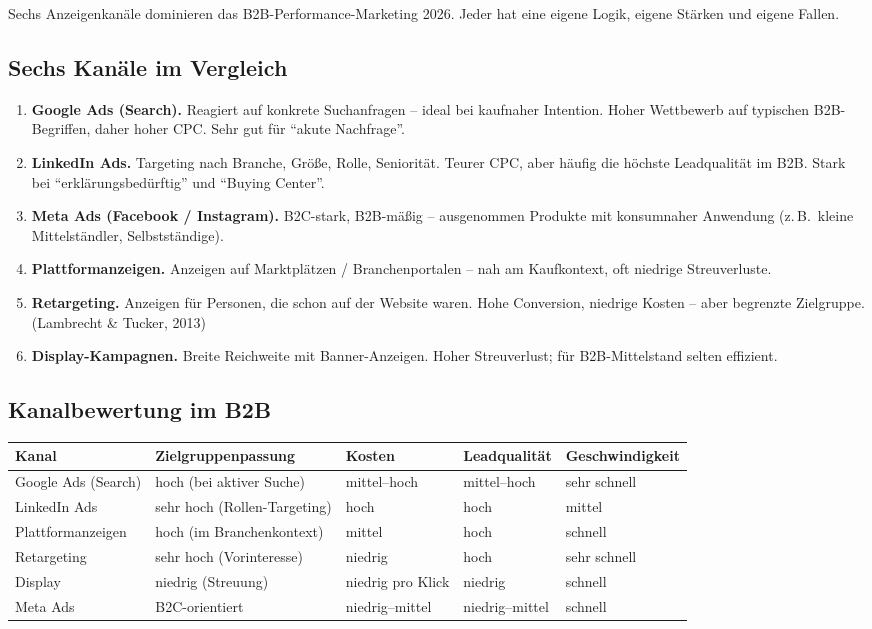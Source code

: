 \documentclass[11pt,a4paper,oneside]{article}
\newcommand{\fachbegriff}[1]{\textbf{#1}}
\newcommand{\quelle}[1]{{\footnotesize\color{lpGray}(#1)}}
\begin{document}
Sechs Anzeigenkanäle dominieren das B2B-Performance-Marketing 2026. Jeder hat eine eigene Logik, eigene Stärken und eigene Fallen.

\subsection{Sechs Kanäle im Vergleich}

\begin{enumerate}
  \item \fachbegriff{Google Ads (Search).} Reagiert auf konkrete Suchanfragen -- ideal bei kaufnaher Intention. Hoher Wettbewerb auf typischen B2B-Begriffen, daher hoher CPC. Sehr gut für ``akute Nachfrage''.
  \item \fachbegriff{LinkedIn Ads.} Targeting nach Branche, Größe, Rolle, Seniorität. Teurer CPC, aber häufig die höchste Leadqualität im B2B. Stark bei ``erklärungsbedürftig'' und ``Buying Center''.
  \item \fachbegriff{Meta Ads (Facebook / Instagram).} B2C-stark, B2B-mäßig -- ausgenommen Produkte mit konsumnaher Anwendung (z.\,B.\ kleine Mittelständler, Selbstständige).
  \item \fachbegriff{Plattformanzeigen.} Anzeigen auf Marktplätzen / Branchenportalen -- nah am Kaufkontext, oft niedrige Streuverluste.
  \item \fachbegriff{Retargeting.} Anzeigen für Personen, die schon auf der Website waren. Hohe Conversion, niedrige Kosten -- aber begrenzte Zielgruppe. \quelle{Lambrecht \& Tucker, 2013}
  \item \fachbegriff{Display-Kampagnen.} Breite Reichweite mit Banner-Anzeigen. Hoher Streuverlust; für B2B-Mittelstand selten effizient.
\end{enumerate}

\subsection{Kanalbewertung im B2B}

\begin{tabularx}{\linewidth}{@{}lXXXX@{}}
\toprule
\textbf{Kanal} & \textbf{Zielgruppenpassung} & \textbf{Kosten} & \textbf{Leadqualität} & \textbf{Geschwindigkeit} \\
\midrule
Google Ads (Search) & hoch (bei aktiver Suche) & mittel--hoch & mittel--hoch & sehr schnell \\
LinkedIn Ads & sehr hoch (Rollen-Targeting) & hoch & hoch & mittel \\
Plattformanzeigen & hoch (im Branchenkontext) & mittel & hoch & schnell \\
Retargeting & sehr hoch (Vorinteresse) & niedrig & hoch & sehr schnell \\
Display & niedrig (Streuung) & niedrig pro Klick & niedrig & schnell \\
Meta Ads & B2C-orientiert & niedrig--mittel & niedrig--mittel & schnell \\
\bottomrule
\end{tabularx}
\end{document}
